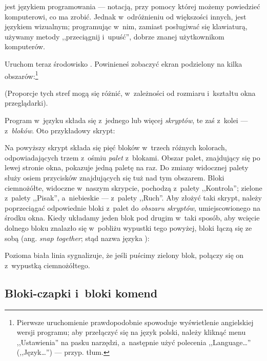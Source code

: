 \documentclass[a4paper]{report}
\begin{document}
\Snap{} jest językiem programowania --- notacją, przy pomocy której możemy powiedzieć komputerowi, co ma zrobić. Jednak w~odróżnieniu od większości innych, \Snap{} jest językiem wizualnym; programując w~nim, zamiast posługiwać się klawiaturą, używamy metody ,,przeciągnij i~upuść'', dobrze znanej użytkownikom komputerów.

Uruchom teraz środowisko \Snap{}. Powinieneś zobaczyć ekran podzielony na kilka obszarów:\footnote{\onehalfspacing Pierwsze uruchomienie  prawdopodobnie spowoduje wyświetlenie angielskiej wersji programu; aby przełączyć się na język polski, należy kliknąć menu ,,Ustawienia''  na pasku narzędzi, a~następnie użyć polecenia ,,Language\ldots'' (,,Język\ldots'') --- przyp. tłum.}\nopagebreak

\begin{center}
\def\svgwidth{\textwidth}

\end{center}

(Proporcje tych stref mogą się różnić, w~zależności od rozmiaru i~kształtu okna przeglądarki).

Program w~języku \Snap{} składa się z~jednego lub więcej \emph{skryptów}, te zaś z~kolei --- z~\emph{bloków}. Oto przykładowy skrypt:\nopagebreak

\label{fig:typowy-skrypt}

Na powyższy skrypt składa się pięć bloków w~trzech różnych kolorach, odpowiadających trzem z~ośmiu \emph{palet} z~blokami. Obszar palet, znajdujący się po lewej stronie okna, pokazuje jedną paletę na raz. Do zmiany widocznej palety służy osiem przycisków znajdujących się tuż nad tym obszarem. Bloki ciemnożółte, widoczne w~naszym skrypcie, pochodzą z~palety ,,Kontrola''; zielone z~palety ,,Pisak'', a~niebieskie --- z~palety ,,Ruch''. Aby złożyć taki skrypt, należy poprzeciągać odpowiednie bloki z~palet do \emph{obszaru skryptów}, umiejscowionego na środku okna. Kiedy układamy jeden blok pod drugim w~taki sposób, aby wcięcie dolnego bloku znalazło się w~pobliżu wypustki tego powyżej, bloki łączą się ze sobą (ang. \textit{snap together}; stąd nazwa języka \Snap{}):\nopagebreak


Pozioma biała linia sygnalizuje, że jeśli puścimy zielony blok, połączy się on z~wypustką ciemnożółtego.

\subsection{Bloki-czapki i~bloki komend}
\end{document}
